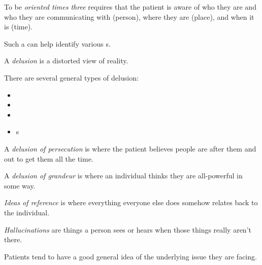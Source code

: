 \begin{definition}\label{def:Oriented_Times_Three}
  To be \emph{oriented times three} requires that the patient is aware of who they are and who they are communicating with (person), where they are (place), and when it is (time).
\end{definition}

Such a  can help identify various s.

\begin{definition}[Delusion]\label{def:Delusion}
  A \emph{delusion} is a distorted view of reality.

  There are several general types of delusion:
  \begin{itemize}[noitemsep]
  \item {}
  \item {}
  \item {}
  \item {}s
  \end{itemize}
\end{definition}

\begin{definition}\label{def:Delusion_of_Persecution}
  A \emph{delusion of persecution} is where the patient believes people are after them and out to get them all the time.
\end{definition}

\begin{definition}\label{def:Delusion_of_Grandeur}
  A \emph{delusion of grandeur} is where an individual thinks they are all-powerful in some way.
\end{definition}

\begin{definition}\label{def:Ideas_of_Reference}
   \emph{Ideas of reference} is where everything everyone else does somehow relates back to the individual.
\end{definition}

\begin{definition}[Hallucination]\label{def:Hallucination}
  \emph{Hallucinations} are things a person sees or hears when those things really aren't there.
\end{definition}

\begin{remark*}
  Patients tend to have a good general idea of the underlying issue they are facing.
\end{remark*}


